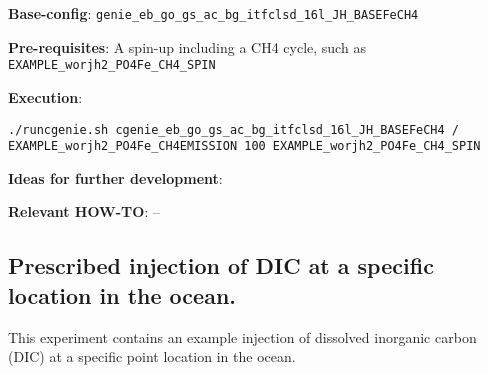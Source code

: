 \documentclass[10pt,twoside]{article}
\begin{document}
\noindent \textbf{Base-config}: \texttt{genie\_eb\_go\_gs\_ac\_bg\_itfclsd\_16l\_JH\_BASEFeCH4}

\noindent \textbf{Pre-requisites}: A spin-up including a CH4 cycle, such as \texttt{EXAMPLE\_worjh2\_PO4Fe\_CH4\_SPIN}

\noindent \textbf{Execution}:
\vspace{-5pt}\begin{verbatim}
./runcgenie.sh cgenie_eb_go_gs_ac_bg_itfclsd_16l_JH_BASEFeCH4 / 
EXAMPLE_worjh2_PO4Fe_CH4EMISSION 100 EXAMPLE_worjh2_PO4Fe_CH4_SPIN
		\end{verbatim}\vspace{-5pt}

\noindent \textbf{Ideas for further development}:

\noindent \textbf{Relevant HOW-TO}: --



\subsection{Prescribed injection of DIC at a specific location in the ocean.}\label{EXAMPLE_worjh2_PO4Fe_DICINJECTION}

This experiment contains an example injection of dissolved inorganic carbon (DIC) at a specific point location  in the ocean.
\end{document}
